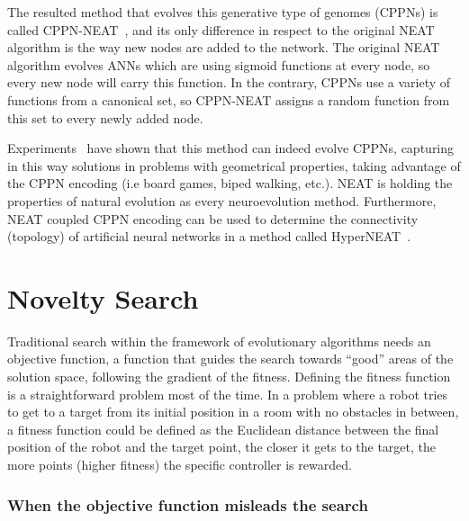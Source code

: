 The resulted method that evolves this generative type of genomes (CPPNs) is called CPPN-NEAT~\citep{stanley2007compositional}, and its only difference in respect to the original NEAT algorithm is the way new nodes are added to the network. The original NEAT algorithm evolves ANNs which are using sigmoid functions at every node, so every new node will carry this function.
In the contrary, CPPNs use a variety of functions from a canonical set, so CPPN-NEAT assigns a random function from this set to every newly added node. 

Experiments~\citep{stanley2007compositional} have shown that this method can indeed evolve CPPNs, capturing in this way solutions in problems with geometrical properties, taking advantage of the CPPN encoding (i.e board games, biped walking, etc.). NEAT is holding the properties of natural evolution as every neuroevolution method. Furthermore, NEAT coupled CPPN encoding can be used to determine the connectivity (topology) of artificial neural networks in  a method called HyperNEAT~\citep{stanley2009hypercube}.




\section{Novelty Search}
\label{NoveltySearch}

Traditional search within the framework of evolutionary algorithms needs an objective function, a function that guides the search towards ``good'' areas of the solution space, following the gradient of the fitness. Defining the fitness function is a straightforward problem most of the time. In a problem where a robot tries to get to a target from its initial position in a room with no obstacles in between, a fitness function could be defined as the Euclidean distance between the final position of the robot and the target point, the closer it gets to the target, the more points (higher fitness) the specific controller is rewarded.

\subsubsection*{When the objective function misleads the search}

